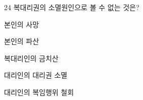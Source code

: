 \begin{question}{24}
복대리권의 소멸원인으로 볼 수 없는 것은?
\begin{choices}
  \item 본인의 사망
  \item 본인의 파산
  \item 복대리인의 금치산
  \item 대리인의 대리권 소멸
  \item 대리인의 복임행위 철회
\end{choices}
\end{question}
